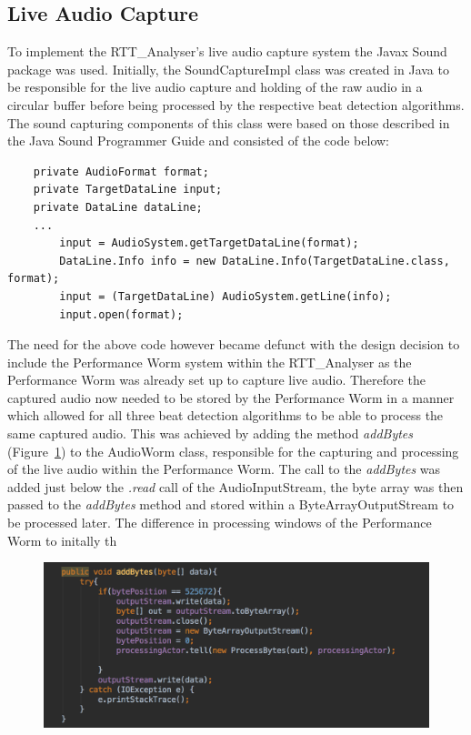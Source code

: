 \documentclass[a4paper, 11pt]{article}
\begin{document}
\subsection{Live Audio Capture}
To implement the RTT\_Analyser's live audio capture system the Javax Sound package was used. Initially, the SoundCaptureImpl class was created in Java to be responsible for the live audio capture and holding of the raw audio in a circular buffer before being processed by the respective beat detection algorithms. The sound capturing components of this class were based on those described in the Java Sound Programmer Guide\cite{javasound} and consisted of the code below:

\begin{lstlisting}
    private AudioFormat format;
    private TargetDataLine input;
    private DataLine dataLine;
    ...
        input = AudioSystem.getTargetDataLine(format);
        DataLine.Info info = new DataLine.Info(TargetDataLine.class, format);
        input = (TargetDataLine) AudioSystem.getLine(info);
        input.open(format); 
\end{lstlisting}

The need for the above code however became defunct with the design decision to include the Performance Worm system within the RTT\_Analyser as the Performance Worm was already set up to capture live audio. Therefore the captured audio now needed to be stored by the Performance Worm in a manner which allowed for all three beat detection algorithms to be able to process the same captured audio. This was achieved by adding the method \textit{addBytes} (Figure~\ref{fig: addBytes}) to the AudioWorm class, responsible for the capturing and processing of the live audio within the Performance Worm. The call to the \textit{addBytes} was added just below the \textit{.read} call of the AudioInputStream, the byte array was then passed to the \textit{addBytes} method and stored within a ByteArrayOutputStream to be processed later. The difference in processing windows of the Performance Worm to initally th

\begin{figure}[ht]
	\centering
	\includegraphics[scale=0.25]{images/addBytes.jpg}
	\caption{}
	\label{fig: addBytes}
\end{figure}
\end{document}

